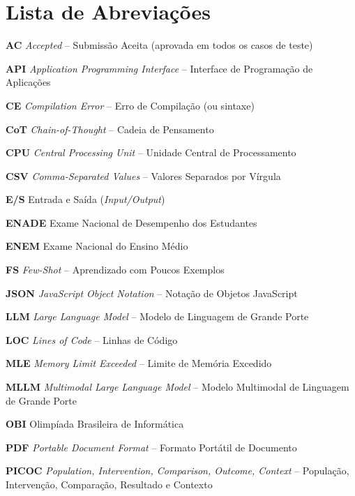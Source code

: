 \chapter*{Lista de Abreviações}

\begin{description}
    \item \textbf{AC} \quad \textit{Accepted} -- Submissão Aceita (aprovada em todos os casos de teste)
    \item \textbf{API} \quad \textit{Application Programming Interface} -- Interface de Programação de Aplicações
    \item \textbf{CE} \quad \textit{Compilation Error} -- Erro de Compilação (ou sintaxe)
    \item \textbf{CoT} \quad \textit{Chain-of-Thought} -- Cadeia de Pensamento
    \item \textbf{CPU} \quad \textit{Central Processing Unit} -- Unidade Central de Processamento
    \item \textbf{CSV} \quad \textit{Comma-Separated Values} -- Valores Separados por Vírgula
    \item \textbf{E/S} \quad Entrada e Saída (\textit{Input/Output})
    \item \textbf{ENADE} \quad Exame Nacional de Desempenho dos Estudantes
    \item \textbf{ENEM} \quad Exame Nacional do Ensino Médio
    \item \textbf{FS} \quad \textit{Few-Shot} -- Aprendizado com Poucos Exemplos
    \item \textbf{JSON} \quad \textit{JavaScript Object Notation} -- Notação de Objetos JavaScript
    \item \textbf{LLM} \quad \textit{Large Language Model} -- Modelo de Linguagem de Grande Porte
    \item \textbf{LOC} \quad \textit{Lines of Code} -- Linhas de Código
    \item \textbf{MLE} \quad \textit{Memory Limit Exceeded} -- Limite de Memória Excedido
    \item \textbf{MLLM} \quad \textit{Multimodal Large Language Model} -- Modelo Multimodal de Linguagem de Grande Porte
    \item \textbf{OBI} \quad Olimpíada Brasileira de Informática
    \item \textbf{PDF} \quad \textit{Portable Document Format} -- Formato Portátil de Documento
    \item \textbf{PICOC} \quad \textit{Population, Intervention, Comparison, Outcome, Context} -- População, Intervenção, Comparação, Resultado e Contexto

\end{description}
